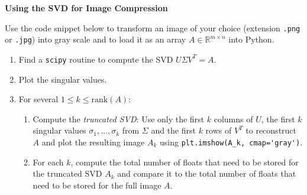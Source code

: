 \textbf{\normalsize Using the SVD for Image Compression}

Use the code snippet below to transform an image of your choice (extension \verb|.png| or \verb|.jpg|) into gray scale and to load it as an array $A \in \mathbb{R}^{m \times n}$ into Python.
\begin{enumerate}
	\item Find a \verb|scipy| routine to compute the SVD $U\Sigma V^T = A$.
	\item Plot the singular values.
	\item For several $1 \leq k \leq \text{rank}(A)$:
	\begin{enumerate}
		\item Compute the \textit{truncated SVD}: Use only the first $k$ columns of $U$, the first $k$ singular values $\sigma_1, \ldots, \sigma_k$ from $\Sigma$ and the first $k$ rows of $V^T$ to reconstruct $A$ and plot the resulting image $A_k$ using \verb|plt.imshow(A_k, cmap='gray')|.
		\item For each $k$, compute the total number of floats that need to be stored for the truncated SVD $A_k$ and compare it to the total number of floats that need to be stored for the full image $A$.
	\end{enumerate} 
\end{enumerate}

